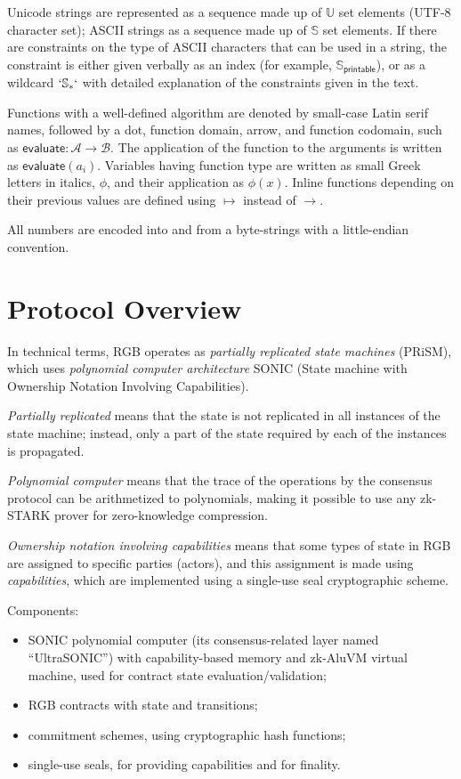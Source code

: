 \documentclass[9pt,oneside]{amsart}
\begin{document}
\begin{multicols}{2}
Unicode strings are represented as a sequence made up of $\mathbb{U}$ set elements
(UTF-8 character set); ASCII strings as a sequence made up of $\mathbb{S}$ set elements.
If there are constraints on the type of ASCII characters that can be used in a string,
the constraint is either given verbally as an index (for example, $\mathbb{S}_\mathsf{printable}$),
or as a wildcard $`\mathbb{S}_*`$ with detailed explanation of the constraints given in the text.

Functions with a well-defined algorithm are denoted by small-case Latin serif names,
followed by a dot, function domain, arrow, and function codomain,
such as $\mathsf{evaluate}: \mathcal{A} \rightarrow \mathcal{B}$.
The application of the function to the arguments is written as $\mathsf{evaluate}(a_i)$.
Variables having function type are written as small Greek letters in italics, $\phi$,
and their application as $\phi(x)$.
Inline functions depending on their previous values are defined using
$\mapsto$ instead of $\rightarrow$.

All numbers are encoded into and from a byte-strings with a little-endian convention.

\section{Protocol Overview}

In technical terms, RGB operates as \emph{partially replicated state machines} (PRiSM),
which uses \emph{polynomial computer architecture} SONIC
(State machine with Ownership Notation Involving Capabilities).

\emph{Partially replicated} means that the state is not replicated in all instances
of the state machine; instead, only a part of the state required by each of the instances
is propagated.

\emph{Polynomial computer} means that the trace of the operations by the consensus protocol
can be arithmetized to polynomials,
making it possible to use any zk-STARK prover for zero-knowledge compression.

\emph{Ownership notation involving capabilities} means that some types of state in RGB
are assigned to specific parties (actors), and this assignment is made using \emph{capabilities},
which are implemented using a single-use seal cryptographic scheme.

Components:
\begin{itemize}
  \item SONIC polynomial computer (its consensus-related layer named ``UltraSONIC'')
  with capability-based memory and zk-AluVM virtual machine,
  used for contract state evaluation/validation;
  \item RGB contracts with state and transitions;
  \item commitment schemes, using cryptographic hash functions;
  \item single-use seals, for providing capabilities and for finality.
\end{itemize}


\end{multicols}
\end{document}
